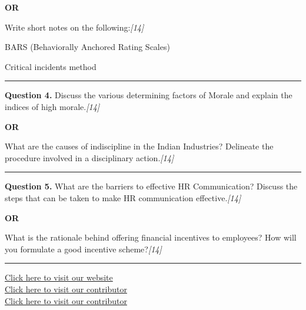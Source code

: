 \documentclass[11pt,a4paper]{article}
\newcommand{\pts}[1]{\hfill   \textit{[#1]}}
\begin{document}
\centerline{   \textbf{OR}}

Write short notes on the following:\pts{14}

\begin{parts}
  \item BARS (Behaviorally Anchored Rating Scales)
  \item Critical incidents method
\end{parts}

\medskip\rule{\linewidth}{0.2pt}




\noindent   \textbf{Question 4.}
Discuss the various determining factors of Morale and explain the indices of high morale.\pts{14}

\centerline{   \textbf{OR}}

What are the causes of indiscipline in the Indian Industries? Delineate the procedure involved in a disciplinary action.\pts{14}

\medskip\rule{\linewidth}{0.2pt}




\noindent   \textbf{Question 5.}
What are the barriers to effective HR Communication? Discuss the steps that can be taken to make HR communication effective.\pts{14}

\centerline{   \textbf{OR}}

What is the rationale behind offering financial incentives to employees? How will you formulate a good incentive scheme?\pts{14}

\vfill
\rule{\linewidth}{0.4pt}

\begin{center}\small
\href{https://bhu-exam.vercel.app/}{Click here to visit our website}\\[4pt]
\href{https://me-aryan.vercel.app/}{Click here to visit our contributor}\\[4pt]
\href{https://quashan-me.vercel.app/}{Click here to visit our contributor}
\end{center}
\end{document}

